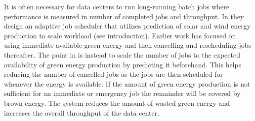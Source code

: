 It is often necessary for data centers to run long-running batch jobs where performance is measured in number of completed jobs and throughput. In \cite{5} they design an adaptive job scheduler that utilizes prediction of solar and wind energy production to scale workload (see introduction). Earlier work has focused on using immediate available green energy and then cancelling and rescheduling jobs thereafter. The point in \cite{5} is instead to scale the number of jobs to the expected availability of green energy production by predicting it beforehand. This helps reducing the number of cancelled jobs as the jobs are then scheduled for whenever the energy is available. If the amount of green energy production is not sufficient for an immediate or emergency job the remainder will be covered by brown energy. The system reduces the amount of wasted green energy and increases the overall throughput of the data center.